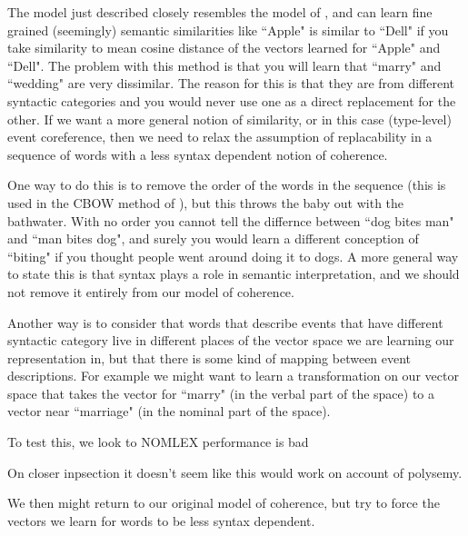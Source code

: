 \documentclass[11pt,letterpaper]{article}
\begin{document}
The model just described closely resembles the model of \cite{rami}, and
can learn fine grained (seemingly) semantic similarities like ``Apple" is
similar to ``Dell" if you take similarity to mean cosine distance of the
vectors learned for ``Apple" and ``Dell".
The problem with this method is that you will learn that ``marry" and
``wedding" are very dissimilar. The reason for this is that they are from
different syntactic categories and you would never use one as a direct replacement
for the other.
If we want a more general notion of similarity, or in this case (type-level) event coreference,
then we need to relax the assumption of replacability in a sequence of words with
a less syntax dependent notion of coherence.

One way to do this is to remove the order of the words in the sequence
(this is used in the CBOW method of \cite{DBLP:journals/corr/abs-1301-3781}),
but this throws the baby out with the bathwater. With no order you cannot
tell the differnce between ``dog bites man" and ``man bites dog", and surely
you would learn a different conception of ``biting" if you thought people went
around doing it to dogs.
A more general way to state this is that syntax plays a role in semantic interpretation,
and we should not remove it entirely from our model of coherence.

Another way is to consider that words that describe events that have
different syntactic category live in different places of the vector space
we are learning our representation in, but that there is some kind of mapping
between event descriptions. For example we might want to learn a transformation
on our vector space that takes the vector for ``marry" (in the verbal part
of the space) to a vector near ``marriage" (in the nominal part of the space).

To test this, we look to NOMLEX
performance is bad

On closer inpsection it doesn't seem like this would work on account of polysemy.


We then might return to our original model of coherence, but try to force
the vectors we learn for words to be less syntax dependent.
\end{document}
